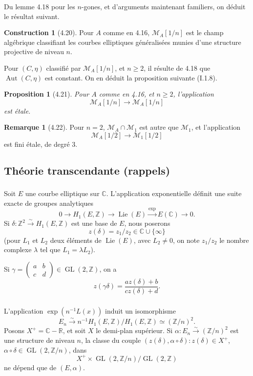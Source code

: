 \documentclass[11pt,a4paper]{amsart}
\theoremstyle{plain}
\newtheorem{proposition}[theorem]{Proposition}
\theoremstyle{definition}
\newtheorem{remark}[theorem]{Remarque}
\newtheorem{construction}[theorem]{Construction}
\DeclareMathOperator{\Aut}{Aut}
\DeclareMathOperator{\Gl}{GL}
\DeclareMathOperator{\Lie}{Lie}
\newcommand{\CC}{\mathbb{C}}
\newcommand{\CM}{\mathcal{M}}
\newcommand{\mll}{\mathcal{M}}
\newcommand{\ZZ}{\mathbb{Z}}
\newcommand{\RR}{\mathbb{R}}
\begin{document}
Du lemme 4.18 pour les $n$-gones, et d'arguments maintenant familiers, on d\'eduit le r\'esultat suivant.

\begin{construction}[4.20]
Pour $A$ comme en 4.16, $\mll_A[1/n]$ est le champ alg\'ebrique classifiant les courbes elliptiques g\'en\'eralis\'ees munies d'une structure projective de niveau $n$.
\end{construction}

Pour $(C, \eta)$ classifi\'e par $\mll_A[1/n]$, et $n \geq 2$, il r\'esulte de 4.18 que $\Aut(C, \eta)$ est constant. On en d\'eduit la proposition suivante (I.1.8).

\begin{proposition}[4.21]
Pour $A$ comme en 4.16, et $n \geq 2$, l'application
\[
\mll_A[1/n] \longrightarrow \CM_A[1/n]
\]
est \'etale.
\end{proposition}

\begin{remark}[4.22]
Pour $n=2$, $\mll_A \cap \mll_1$ est autre que $\mll_1$, et l'application
\[
\CM_A[1/2] \longrightarrow \CM_1[1/2]
\]
est fini \'etale, de degr\'e 3.
\end{remark}


\subsection{Th\'eorie transcendante (rappels)}

\subsubsection{}
Soit $E$ une courbe elliptique sur $\CC$. L'application exponentielle d\'efinit une suite exacte de groupes analytiques
\[
0 \longrightarrow H_1(E, \ZZ) \longrightarrow \Lie(E) \xrightarrow{\exp} E(\CC) \longrightarrow 0.
\]
Si $\delta \colon \ZZ^2 \xrightarrow{\sim} H_1(E, \ZZ)$ est une base de $E$, nous poserons
\[
z(\delta) = z_1/z_2 \in \CC \cup \{\infty\}
\]
(pour $L_1$ et $L_2$ deux \'el\'ements de $\Lie(E)$, avec $L_2 \neq 0$, on note $z_1/z_2$ le nombre complexe $\lambda$ tel que $L_1 = \lambda L_2$).

Si $\gamma = \begin{pmatrix} a & b \\ c & d \end{pmatrix} \in \Gl(2, \ZZ)$, on a
\[
z(\gamma\delta) = \frac{a z(\delta) + b}{c z(\delta) + d}.
\]

\subsubsection{}
L'application $\exp(n^{-1}L(x))$ induit un isomorphisme
\begin{equation}\label{eq:5.2.1}
E_n \xrightarrow{\sim} n^{-1}H_1(E, \ZZ)/H_1(E, \ZZ) \simeq (\ZZ/n)^2.
\end{equation}
Posons $X^+ = \CC - \RR$, et soit $X$ le demi-plan sup\'erieur. Si $\alpha \colon E_n \xrightarrow{\sim} (\ZZ/n)^2$ est une structure de niveau $n$, la classe du couple $(z(\delta), \alpha \circ \delta): z(\delta) \in X^+$, $\alpha \circ \delta \in \Gl(2, \ZZ/n)$, dans
\[
X^+ \times \Gl(2, \ZZ/n) / \Gl(2, \ZZ)
\]
ne d\'epend que de $(E, \alpha)$.
\end{document}
